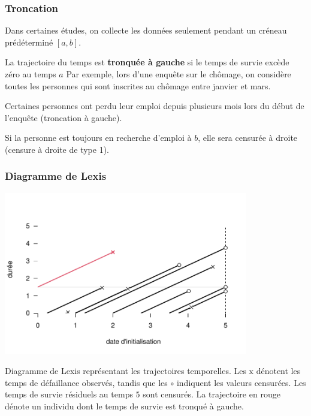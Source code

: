 \documentclass{beamer}
\begin{document}
\begin{frame}
 \frametitle{Troncation}
 Dans certaines études, on collecte les données seulement pendant un créneau prédéterminé $[a, b]$. 
 \bi \item La trajectoire du temps est \textbf{tronquée à gauche} si le temps de survie excède zéro au temps $a$
\ei
Par exemple, lors d'une enquête sur le chômage, on considère toutes les personnes qui sont inscrites au chômage entre janvier et mars. 
\bi \item Certaines personnes ont perdu leur emploi depuis plusieurs mois lors du début de l'enquête (troncation à gauche). 
 \item Si la personne est toujours en recherche d'emploi à $b$, elle sera censurée à droite (censure à droite de type 1).
\ei
\end{frame}

\begin{frame}
\frametitle{Diagramme de Lexis}
 \begin{center}
  \includegraphics[width = 0.8\textwidth]{img/c7/07-lexis_fr.pdf}
 \end{center}
{ \footnotesize Diagramme de Lexis représentant les trajectoires temporelles. Les $\mathrm{x}$ dénotent les temps de défaillance observés, tandis que les $\circ$ indiquent les valeurs censurées. Les temps de survie résiduels au temps $5$ sont censurés. La trajectoire en rouge dénote un individu dont le temps de survie est tronqué à gauche.

}
\end{frame}
\end{document}
